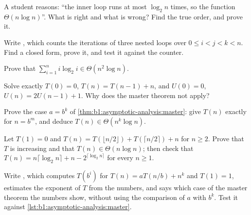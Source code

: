 \begin{exercise}[$\star\star$]\label{exo:b1:asymptotic-analysis:6}
A student reasons: ``the inner loop runs at most $\log_2 n$ times, so the function  $\Theta(n \log n)$''. What is
right and what is wrong? Find the true order, and prove it.
\end{exercise}

\begin{exercise}[$\star\star$]\label{exo:b1:asymptotic-analysis:7}
Write , which counts the iterations of three nested loops over $0 \leq i < j < k < n$. Find a
closed form, prove it, and test it against the counter.
\end{exercise}

\begin{exercise}[$\star\star$]\label{exo:b1:asymptotic-analysis:8}
Prove that $\sum_{i=1}^n i \log_2 i \in \Theta(n^2 \log n)$.
\end{exercise}

\begin{exercise}[$\star\star$]\label{exo:b1:asymptotic-analysis:9}
Solve exactly $T(0) = 0$, $T(n) = T(n - 1) + n$, and $U(0) = 0$, $U(n) = 2U(n - 1) + 1$. Why does the master theorem not
apply?
\end{exercise}

\begin{exercise}[$\star\star\star$]\label{exo:b1:asymptotic-analysis:10}
Prove the case $a = b^k$ of \cref{thm:b1:asymptotic-analysis:master}: give $T(n)$ exactly for $n = b^m$, and deduce
$T(n) \in \Theta(n^k \log n)$.
\end{exercise}

\begin{exercise}[$\star\star\star$]\label{exo:b1:asymptotic-analysis:11}
Let $T(1) = 0$ and $T(n) = T(\lfloor n/2 \rfloor) + T(\lceil n/2 \rceil) + n$ for $n \geq 2$. Prove that $T$ is increasing
and that $T(n) \in \Theta(n \log n)$; then check that $T(n) = n\lceil \log_2 n \rceil + n - 2^{\lceil \log_2 n
\rceil}$ for every $n \geq 1$.
\end{exercise}

\begin{exercise}[$\star\star\star$]\label{exo:b1:asymptotic-analysis:12}
Write , which computes $T(b^i)$ for $T(n) = aT(n/b) + n^k$ and $T(1) = 1$, estimates the
exponent of $T$ from the numbers, and says which case of the master theorem the numbers show, without using the
comparison of $a$ with $b^k$. Test it against \cref{lst:b1:asymptotic-analysis:master}.
\end{exercise}

